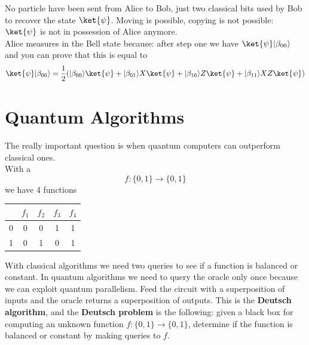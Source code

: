 \documentclass[10pt]{report}
\begin{document}
No particle have been sent from Alice to Bob, just two classical bits used by Bob to recover the state $\ket{\psi}$. Moving is possible, copying is not possible: $\ket{\psi}$ is not in possession of Alice anymore.\\
Alice measures in the Bell state because: after step one we have $\ket{\psi}|\beta_{00}\rangle$ and you can prove that this is equal to $$\ket{\psi}|\beta_{00}\rangle = \frac{1}{2}(|\beta_{00}\rangle\ket{\psi} + |\beta_{01}\rangle X\ket{\psi} + |\beta_{10}\rangle Z\ket{\psi} + |\beta_{11}\rangle XZ\ket{\psi})$$
\section{Quantum Algorithms}
The really important question is when quantum computers can outperform classical ones.\\
With a $$f:\{0,1\}\rightarrow\{0,1\}$$ we have 4 functions
\begin{center}
	\begin{tabular}{c | c c c c}
& $f_1$ & $f_2$ & $f_3$ & $f_4$\\
\hline
0 & 0 & 0 & 1 & 1\\
1 & 0 & 1 & 0 & 1
\end{tabular}
\end{center}
With classical algorithms we need two queries to see if a function is balanced or constant. In quantum algorithms we need to query the oracle only once because we can exploit quantum parallelism. Feed the circuit with a superposition of inputs and the oracle returns a superposition of outputs. This is the \textbf{Deutsch algorithm}, and the \textbf{Deutsch problem} is the following: given a black box for computing an unknown function $f:\{0,1\}\rightarrow\{0,1\}$, determine if the function is balanced or constant by making queries to $f$.
\end{document}
